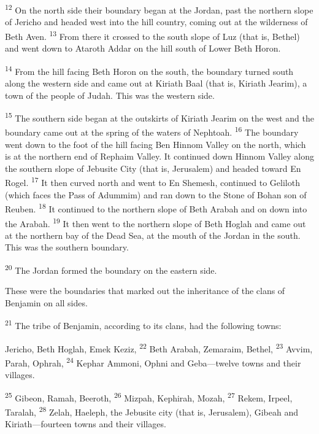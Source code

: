 \documentclass[12pt,twoside]{article}
\newcommand{\vs}[1]{\textsuperscript{#1}}
\begin{document}
\begin{adjustwidth}{0.5cm}{0cm}
  \hspace{0.5cm}\vs{12} On the north side their boundary began at the Jordan, past the northern slope of Jericho and headed west into the hill country, coming out at the wilderness of Beth Aven.
  \vs{13} From there it crossed to the south slope of Luz (that is, Bethel) and went down to Ataroth Addar on the hill south of Lower Beth Horon.

  \vs{14} From the hill facing Beth Horon on the south, the boundary turned south along the western side and came out at Kiriath Baal (that is, Kiriath Jearim), a town of the people of Judah. This was the western side.

  \vs{15} The southern side began at the outskirts of Kiriath Jearim on the west and the boundary came out at the spring of the waters of Nephtoah.
  \vs{16} The boundary went down to the foot of the hill facing Ben Hinnom Valley on the north, which is at the northern end of Rephaim Valley. It continued down Hinnom Valley along the southern slope of Jebusite City (that is, Jerusalem) and headed toward En Rogel.
  \vs{17} It then curved north and went to En Shemesh, continued to Geliloth (which faces the Pass of Adummim) and ran down to the Stone of Bohan son of Reuben.
  \vs{18} It continued to the northern slope of Beth Arabah and on down into the Arabah.
  \vs{19} It then went to the northern slope of Beth Hoglah and came out at the northern bay of the Dead Sea, at the mouth of the Jordan in the south. This was the southern boundary.

  \vs{20} The Jordan formed the boundary on the eastern side.
  
\end{adjustwidth}

\noindent These were the boundaries that marked out the inheritance of the clans of Benjamin on all sides.\vspace{0.4cm}

\noindent \vs{21} The tribe of Benjamin, according to its clans, had the following towns:

\begin{adjustwidth}{0.5cm}{0cm}
  \hspace{0.5cm}Jericho, Beth Hoglah, Emek Keziz,
  \vs{22} Beth Arabah, Zemaraim, Bethel,
  \vs{23} Avvim, Parah, Ophrah,
  \vs{24} Kephar Ammoni, Ophni and Geba---twelve towns and their villages.

  \vs{25} Gibeon, Ramah, Beeroth,
  \vs{26} Mizpah, Kephirah, Mozah,
  \vs{27} Rekem, Irpeel, Taralah,
  \vs{28} Zelah, Haeleph, the Jebusite city (that is, Jerusalem), Gibeah and Kiriath---fourteen towns and their villages.
\end{adjustwidth}
\end{document}
